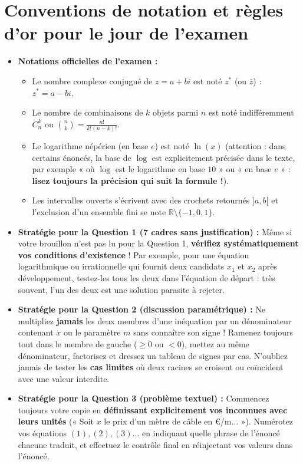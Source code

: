 \documentclass[11pt,a4paper,oneside]{book}
\newcommand{\R}{\mathbb{R}}
\begin{document}
\section*{Conventions de notation et règles d'or pour le jour de l'examen}

\begin{itemize}
    \item \textbf{Notations officielles de l'examen :}
    \begin{itemize}
        \item Le nombre complexe conjugué de $z = a+bi$ est noté $z^*$ (ou $\bar{z}$) : $z^* = a-bi$.
        \item Le nombre de combinaisons de $k$ objets parmi $n$ est noté indifféremment $C_n^k$ ou $\binom{n}{k} = \frac{n!}{k!(n-k)!}$.
        \item Le logarithme népérien (en base $e$) est noté $\ln(x)$ (attention : dans certains énoncés, la base de $\log$ est explicitement précisée dans le texte, par exemple « où $\log$ est le logarithme en base $10$ » ou « en base $e$ » : \textbf{lisez toujours la précision qui suit la formule !}).
        \item Les intervalles ouverts s'écrivent avec des crochets retournés $]a, b[$ et l'exclusion d'un ensemble fini se note $\R \setminus \{-1, 0, 1\}$.
    \end{itemize}
    \item \textbf{Stratégie pour la Question 1 (7 cadres sans justification) :} Même si votre brouillon n'est pas lu pour la Question 1, \textbf{vérifiez systématiquement vos conditions d'existence} ! Par exemple, pour une équation logarithmique ou irrationnelle qui fournit deux candidats $x_1$ et $x_2$ après développement, testez-les tous les deux dans l'équation de départ : très souvent, l'un des deux est une solution parasite à rejeter.
    \item \textbf{Stratégie pour la Question 2 (discussion paramétrique) :} Ne multipliez \textbf{jamais} les deux membres d'une inéquation par un dénominateur contenant $x$ ou le paramètre $m$ sans connaître son signe ! Ramenez toujours tout dans le membre de gauche ($\ge 0$ ou $< 0$), mettez au même dénominateur, factorisez et dressez un tableau de signes par cas. N'oubliez jamais de tester les \textbf{cas limites} où deux racines se croisent ou coïncident avec une valeur interdite.
    \item \textbf{Stratégie pour la Question 3 (problème textuel) :} Commencez toujours votre copie en \textbf{définissant explicitement vos inconnues avec leurs unités} (« Soit $x$ le prix d'un mètre de câble en €/m... »). Numérotez vos équations $(1), (2), (3)\dots$ en indiquant quelle phrase de l'énoncé chacune traduit, et effectuez le contrôle final en réinjectant vos valeurs dans l'énoncé.
\end{itemize}
\end{document}

